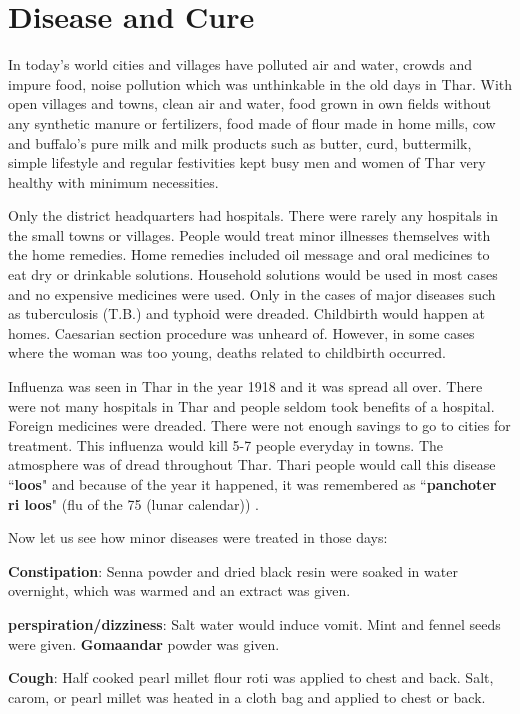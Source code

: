 \chapter{Disease and Cure}
In today's world cities and villages have polluted air and water, crowds and
impure food, noise pollution which was unthinkable in the old days in Thar.
With open villages and towns, clean air and water, food grown in own fields
without any synthetic manure or fertilizers, food made of flour made in home
mills, cow and buffalo's pure milk and milk products such as butter, curd,
buttermilk, simple lifestyle and regular festivities kept busy men and women of
Thar very healthy with minimum necessities.

Only the district headquarters had hospitals. There were rarely any hospitals
in the small towns or villages. People would treat minor illnesses themselves
with the home remedies. Home remedies included oil message and oral medicines
to eat dry or drinkable solutions. Household solutions would be used in most
cases and no expensive medicines were used. Only in the cases of major diseases
such as tuberculosis (T.B.) and typhoid were dreaded. Childbirth would happen
at homes. Caesarian section procedure was unheard of. However, in some cases
where the woman was too young, deaths related to childbirth occurred.

Influenza was seen in Thar in the year 1918 and it was spread all over. There
were not many hospitals in Thar and people seldom took benefits of a hospital.
Foreign medicines were dreaded. There were not enough savings to go to cities
for treatment. This influenza would kill 5-7 people everyday in towns. The
atmosphere was of dread throughout Thar. Thari people would call this disease
``\textbf{loos}" and because of the year it happened, it was remembered as
``\textbf{panchoter ri loos}" (flu of the 75 (lunar calendar)) . 

Now let us see how minor diseases were treated in those days:

\textbf{Constipation}: Senna powder and dried black resin were soaked in water
overnight, which was warmed and an extract was given.

\textbf{perspiration/dizziness}: Salt water would induce vomit. Mint and fennel
seeds were given. \textbf{Gomaandar} powder was given.

\textbf{Cough}: Half cooked pearl millet flour roti was applied to chest and
back. Salt, carom, or pearl millet was heated in a cloth bag and applied to
chest or back.

